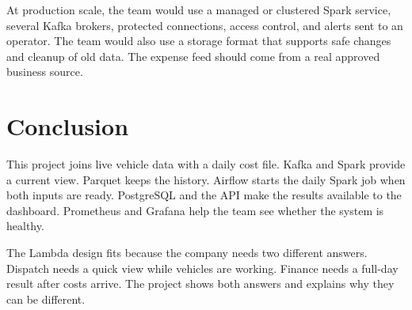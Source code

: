\documentclass[11pt,a4paper]{article}
\begin{document}
At production scale, the team would use a managed or clustered Spark service, several Kafka
brokers, protected connections, access control, and alerts sent to an operator. The team would also
use a storage format that supports safe changes and cleanup of old data. The expense feed should
come from a real approved business source.

\section{Conclusion}

This project joins live vehicle data with a daily cost file. Kafka and Spark provide a current view.
Parquet keeps the history. Airflow starts the daily Spark job when both inputs are ready. PostgreSQL
and the API make the results available to the dashboard. Prometheus and Grafana help the team see
whether the system is healthy.

The Lambda design fits because the company needs two different answers. Dispatch needs a quick
view while vehicles are working. Finance needs a full-day result after costs arrive. The project
shows both answers and explains why they can be different.
\end{document}
